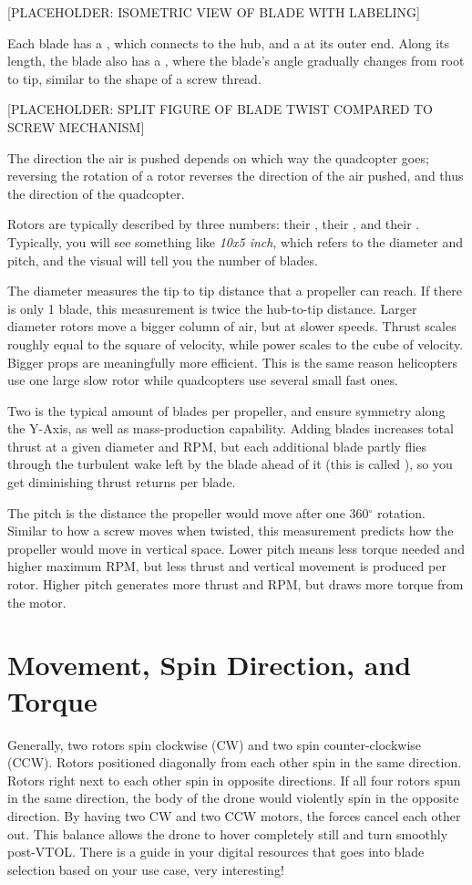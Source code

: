[PLACEHOLDER: ISOMETRIC VIEW OF BLADE WITH LABELING]

Each blade has a , which connects to the hub, and a  at its outer end. Along its length, the blade also has a , where the blade's angle gradually changes from root to tip, similar to the shape of a screw thread.

[PLACEHOLDER: SPLIT FIGURE OF BLADE TWIST COMPARED TO SCREW MECHANISM]

The direction the air is pushed depends on which way the quadcopter goes; reversing the rotation of a rotor reverses the direction of the air pushed, and thus the direction of the quadcopter.

Rotors are typically described by three numbers: their , their , and their . Typically, you will see something like \textit{10x5 inch}, which refers to the diameter and pitch, and the visual will tell you the number of blades.

The diameter measures the tip to tip distance that a propeller can reach. If there is only 1 blade, this measurement is twice the hub-to-tip distance. Larger diameter rotors move a bigger column of air, but at slower speeds. Thrust scales roughly equal to the square of velocity, while power scales to the cube of velocity. Bigger props are meaningfully more efficient. This is the same reason helicopters use one large slow rotor while quadcopters use several small fast ones.

Two is the typical amount of blades per propeller, and ensure symmetry along the Y-Axis, as well as mass-production capability. Adding blades increases total thrust at a given diameter and RPM, but each additional blade partly flies through the turbulent wake left by the blade ahead of it (this is called ), so you get diminishing thrust returns per blade.

The pitch is the distance the propeller would move after one 360$^\circ$ rotation. Similar to how a screw moves when twisted, this measurement predicts how the propeller would move in vertical space. Lower pitch means less torque needed and higher maximum RPM, but less thrust and vertical movement is produced per rotor. Higher pitch generates more thrust and RPM, but draws more torque from the motor.

\section{Movement, Spin Direction, and Torque}
Generally, two rotors spin clockwise (CW) and two spin counter-clockwise (CCW). Rotors positioned diagonally from each other spin in the same direction. Rotors right next to each other spin in opposite directions. If all four rotors spun in the same direction, the body of the drone would violently spin in the opposite direction. By having two CW and two CCW motors, the forces cancel each other out. This balance allows the drone to hover completely still and turn smoothly post-VTOL. 
There is a guide in your digital resources that goes into blade selection based on your use case, very interesting!

